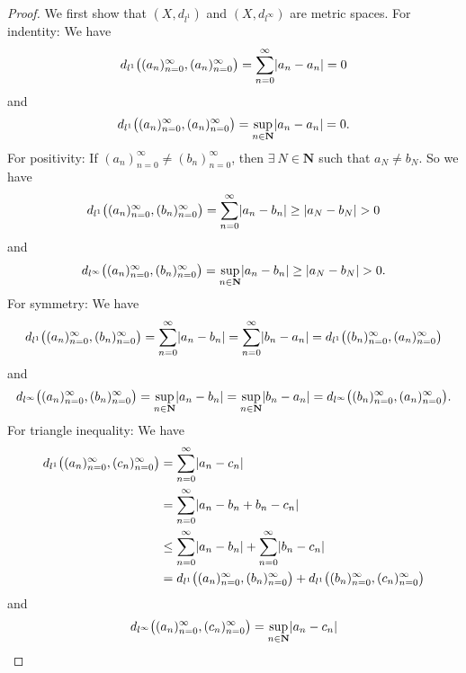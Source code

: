\begin{proof}
    We first show that \((X, d_{l^1})\) and \((X, d_{l^\infty})\) are metric spaces.
    For indentity:
    We have
    \[
        d_{l^1}\big((a_n)_{n = 0}^\infty, (a_n)_{n = 0}^\infty\big) = \sum_{n = 0}^\infty \abs*{a_n - a_n} = 0
    \]
    and
    \[
        d_{l^1}\big((a_n)_{n = 0}^\infty, (a_n)_{n = 0}^\infty\big) = \sup_{n \in \mathbf{N}} \abs*{a_n - a_n} = 0.
    \]
    For positivity:
    If \((a_n)_{n = 0}^\infty \neq (b_n)_{n = 0}^\infty\), then \(\exists\ N \in \mathbf{N}\) such that \(a_N \neq b_N\).
    So we have
    \[
        d_{l^1}\big((a_n)_{n = 0}^\infty, (b_n)_{n = 0}^\infty\big) = \sum_{n = 0}^\infty \abs*{a_n - b_n} \geq \abs*{a_N - b_N} > 0
    \]
    and
    \[
        d_{l^\infty}\big((a_n)_{n = 0}^\infty, (b_n)_{n = 0}^\infty\big) = \sup_{n \in \mathbf{N}} \abs*{a_n - b_n} \geq \abs*{a_N - b_N} > 0.
    \]
    For symmetry:
    We have
    \[
        d_{l^1}\big((a_n)_{n = 0}^\infty, (b_n)_{n = 0}^\infty\big) = \sum_{n = 0}^\infty \abs*{a_n - b_n} = \sum_{n = 0}^\infty \abs*{b_n - a_n} = d_{l^1}\big((b_n)_{n = 0}^\infty, (a_n)_{n = 0}^\infty\big)
    \]
    and
    \[
        d_{l^\infty}\big((a_n)_{n = 0}^\infty, (b_n)_{n = 0}^\infty\big) = \sup_{n \in \mathbf{N}} \abs*{a_n - b_n} = \sup_{n \in \mathbf{N}} \abs*{b_n - a_n} = d_{l^\infty}\big((b_n)_{n = 0}^\infty, (a_n)_{n = 0}^\infty\big).
    \]
    For triangle inequality:
    We have
    \begin{align*}
        d_{l^1}\big((a_n)_{n = 0}^\infty, (c_n)_{n = 0}^\infty\big) & = \sum_{n = 0}^\infty \abs*{a_n - c_n}                                                                                      \\
                                                                    & = \sum_{n = 0}^\infty \abs*{a_n - b_n + b_n - c_n}                                                                          \\
                                                                    & \leq \sum_{n = 0}^\infty \abs*{a_n - b_n} + \sum_{n = 0}^\infty \abs*{b_n - c_n}                                            \\
                                                                    & = d_{l^1}\big((a_n)_{n = 0}^\infty, (b_n)_{n = 0}^\infty\big) + d_{l^1}\big((b_n)_{n = 0}^\infty, (c_n)_{n = 0}^\infty\big)
    \end{align*}
    and
    \begin{align*}
        d_{l^\infty}\big((a_n)_{n = 0}^\infty, (c_n)_{n = 0}^\infty\big) & = \sup_{n \in \mathbf{N}} \abs*{a_n - c_n}                                                                                             \\

\end{align*}
\end{proof}
